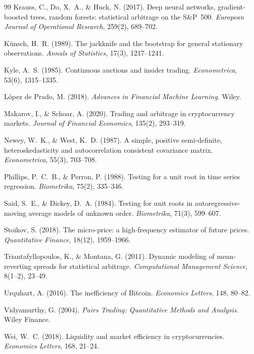 \documentclass[11pt]{article}
\begin{document}
\begin{thebibliography}{99}
Krauss, C., Do, X.~A., \& Huck, N. (2017). Deep neural networks, gradient-boosted trees,
random forests: statistical arbitrage on the S\&P~500. \emph{European Journal of
Operational Research}, 259(2), 689--702.

K\"unsch, H.~R. (1989). The jackknife and the bootstrap for general stationary
observations. \emph{Annals of Statistics}, 17(3), 1217--1241.

Kyle, A.~S. (1985). Continuous auctions and insider trading.
\emph{Econometrica}, 53(6), 1315--1335.

L\'opez de Prado, M. (2018). \emph{Advances in Financial Machine Learning}. Wiley.

Makarov, I., \& Schoar, A. (2020). Trading and arbitrage in cryptocurrency markets.
\emph{Journal of Financial Economics}, 135(2), 293--319.

Newey, W.~K., \& West, K.~D. (1987). A simple, positive semi-definite,
heteroskedasticity and autocorrelation consistent covariance matrix.
\emph{Econometrica}, 55(3), 703--708.

Phillips, P.~C.~B., \& Perron, P. (1988). Testing for a unit root in time series
regression. \emph{Biometrika}, 75(2), 335--346.

Said, S.~E., \& Dickey, D.~A. (1984). Testing for unit roots in autoregressive-moving
average models of unknown order. \emph{Biometrika}, 71(3), 599--607.

Stoikov, S. (2018). The micro-price: a high-frequency estimator of future prices.
\emph{Quantitative Finance}, 18(12), 1959--1966.

Triantafyllopoulos, K., \& Montana, G. (2011). Dynamic modeling of mean-reverting
spreads for statistical arbitrage. \emph{Computational Management Science}, 8(1--2), 23--49.

Urquhart, A. (2016). The inefficiency of Bitcoin. \emph{Economics Letters}, 148, 80--82.

Vidyamurthy, G. (2004). \emph{Pairs Trading: Quantitative Methods and Analysis}.
Wiley Finance.

Wei, W.~C. (2018). Liquidity and market efficiency in cryptocurrencies.
\emph{Economics Letters}, 168, 21--24.

\end{thebibliography}
\end{document}
